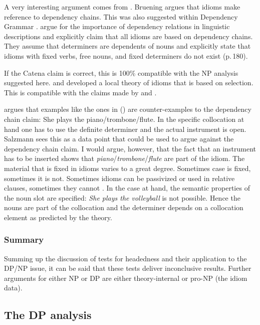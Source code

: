 \documentclass[output=paper
  ,nobabel
  ,draftmode
  ,uniformtopskip %
  ,colorlinks, citecolor=brown
]{langscibook}
\begin{document}

A very interesting argument comes from \citet[Section~5]{Bruening2020a}. Bruening argues that idioms make reference to
dependency chains. This was also suggested within Dependency Grammar
\parencites{OGrady98a-u}[Section~4.2]{OG2012a-u}. \citet[Section~4.2]{OG2012a-u}
argue for the importance of dependency relations in linguistic descriptions and explicitly claim
that all idioms are based on dependency chains. They assume that determiners are dependents of nouns
and explicitly state that idioms with fixed verbs, free nouns, and fixed determiners do not exist (p.\,180). 

If the Catena claim is correct, this is 100\% compatible with the NP analysis suggested
here. \citet{Sag2007a} and \citet*{KSF2015a} developed a local theory of idioms that is based on
selection. This is compatible with the claims made by \citet{Bruening2020a} and
\citet[Section~4.2]{OG2012a-u}.

\citet[]{Salzmann2020a} argues that examples like the ones in () are counter-examples to the
dependency chain claim:
\ea
She plays the piano/trombone/flute.
\z
In the specific collocation at hand one has to use the definite determiner and the actual instrument
is open. Salzmann sees this as a data point that could be used to argue against the dependency chain
claim. I would argue, however, that the fact that an instrument has to be inserted shows that
\emph{piano}/\emph{trombone}/\emph{flute} are part of the idiom. The material that is fixed in idioms varies to a great
degree. Sometimes case is fixed, sometimes it is not. Sometimes idioms can be passivized or used in
relative clauses, sometimes they cannot \citep{NSW94a}. In the case at hand, the semantic properties of the noun
slot are specified: \emph{She plays the volleyball} is not possible. Hence the nouns are part of
the collocation and the determiner depends on a collocation element as predicted by the theory.


\subsubsection{Summary}

Summing up the discussion of  tests for headedness and their application to the DP/NP issue, it
can be said that these tests deliver inconclusive results. Further arguments for either NP or DP are
either theory-internal or pro-NP (the idiom data).


\subsection{The DP analysis}
\end{document}
